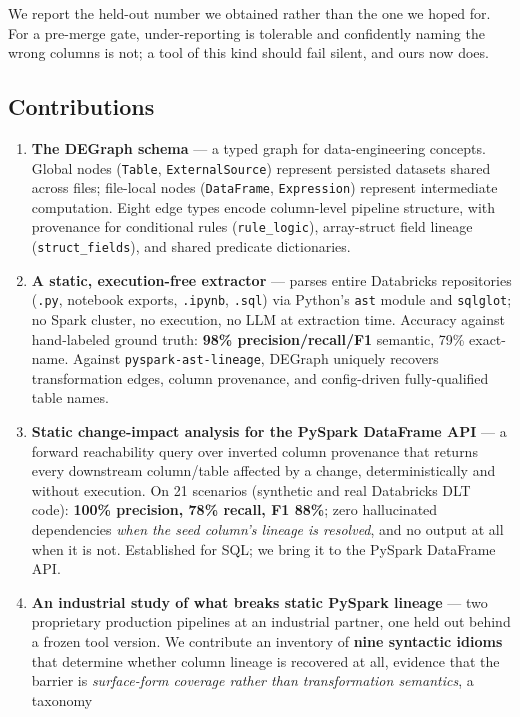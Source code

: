\documentclass[11pt]{article}
\newcommand{\code}[1]{\texttt{#1}}
\begin{document}
We report the held-out number we obtained rather than the one we hoped for. For a
pre-merge gate, under-reporting is tolerable and confidently naming the wrong columns
is not; a tool of this kind should fail silent, and ours now does.

\subsection{Contributions}
\begin{enumerate}
\item \textbf{The DEGraph schema} --- a typed graph for data-engineering concepts.
Global nodes (\code{Table}, \code{ExternalSource}) represent persisted datasets
shared across files; file-local nodes (\code{DataFrame}, \code{Expression})
represent intermediate computation. Eight edge types encode column-level pipeline
structure, with provenance for conditional rules (\code{rule_logic}), array-struct
field lineage (\code{struct_fields}), and shared predicate dictionaries.
\item \textbf{A static, execution-free extractor} --- parses entire Databricks
repositories (\code{.py}, notebook exports, \code{.ipynb}, \code{.sql}) via Python's
\code{ast} module and \code{sqlglot}; no Spark cluster, no execution, no LLM at
extraction time. Accuracy against hand-labeled ground truth: \textbf{98\%
precision/recall/F1} semantic, 79\% exact-name. Against \code{pyspark-ast-lineage},
DEGraph uniquely recovers transformation edges, column provenance, and config-driven
fully-qualified table names.
\item \textbf{Static change-impact analysis for the PySpark DataFrame API} --- a
forward reachability query over inverted column provenance that returns every
downstream column/table affected by a change, deterministically and without
execution. On 21 scenarios (synthetic and real Databricks DLT code): \textbf{100\%
precision, 78\% recall, F1 88\%}; zero hallucinated dependencies \emph{when the seed
column's lineage is resolved}, and no output at all when it is not. Established for
SQL; we bring it to the PySpark DataFrame API.
\item \textbf{An industrial study of what breaks static PySpark lineage} --- two
proprietary production pipelines at an industrial partner, one held out behind a frozen tool
version. We contribute an inventory of \textbf{nine syntactic idioms} that determine
whether column lineage is recovered at all, evidence that the barrier is
\emph{surface-form coverage rather than transformation semantics}, a taxonomy

\end{enumerate}
\end{document}
